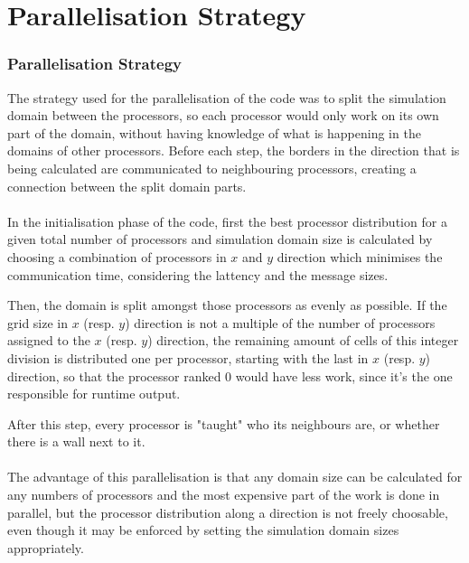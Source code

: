 \documentclass[8pt]{beamer}
\begin{document}
\section{Parallelisation Strategy}
\begin{frame}
	\frametitle{Parallelisation Strategy}
	
	The strategy used for the parallelisation of the code was to split the simulation domain between the processors, so each processor would only work on its own part of the domain, without having knowledge of what is happening in the domains of other processors. Before each step, the borders in the direction that is being calculated are communicated to neighbouring processors, creating a connection between the split domain parts.\\~\\
	
	In the initialisation phase of the code, first the best processor distribution for a given total number of processors and simulation domain size is calculated by choosing a combination of processors in $x$ and $y$ direction which minimises the communication time, considering the lattency and the message sizes.
	
	Then, the domain is split amongst those processors as evenly as possible. If the grid size in $x$ (resp. $y$) direction is not a multiple of the number of processors assigned to the $x$ (resp. $y$) direction, the remaining amount of cells of this integer division is distributed one per processor, starting with the last in $x$ (resp. $y$) direction, so that the processor ranked $0$ would have less work, since it's the one responsible for runtime output.
	
	After this step, every processor is "taught" who its neighbours are, or whether there is a wall next to it.\\~\\
	
	The advantage of this parallelisation is that any domain size can be calculated for any numbers of processors and the most expensive part of the work is done in parallel, but the processor distribution along a direction is not freely choosable, even though it may be enforced by setting the simulation domain sizes appropriately.
\end{frame}
\end{document}

